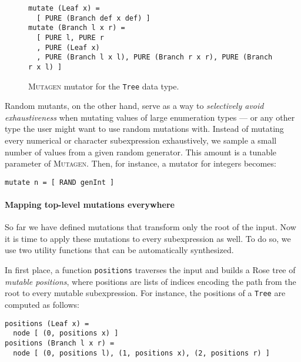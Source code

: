 \documentclass[sigconf, anonymous, review]{acmart}
\newcommand{\mutagen}{\textsc{Mutagen}\xspace}
\begin{document}
\begin{figure}[b]
\begin{verbatim}
mutate (Leaf x) =
  [ PURE (Branch def x def) ]
mutate (Branch l x r) =
  [ PURE l, PURE r
  , PURE (Leaf x)
  , PURE (Branch l x l), PURE (Branch r x r), PURE (Branch r x l) ]
\end{verbatim}
\vspace{-5pt}
\caption{\label{fig:mutagen:mutator}\mutagen mutator for the \texttt{Tree} data
  type.}
\vspace{-5pt}
\end{figure}

%
Random mutants, on the other hand, serve as a way to \emph{selectively avoid
  exhaustiveness} when mutating values of large enumeration types --- or any
other type the user might want to use random mutations with.
%
Instead of mutating every numerical or character subexpression exhaustively, we
sample a small number of values from a given random generator.
%
This amount is a tunable parameter of \mutagen.
%
Then, for instance, a mutator for integers becomes:

\begin{verbatim}
mutate n = [ RAND genInt ]
\end{verbatim}


\paragraph{Mapping top-level mutations everywhere}

So far we have defined mutations that transform only the root of the input.
%
Now it is time to apply these mutations to every subexpression as well.
%
To do so, we use two utility functions that can be automatically synthesized.

In first place, a function \texttt{positions} traverses the input and builds a
Rose tree of \emph{mutable positions}, where positions are lists of indices
encoding the path from the root to every mutable subexpression.
%
For instance, the positions of a \texttt{Tree} are computed as follows:

\begin{verbatim}
positions (Leaf x) =
  node [ (0, positions x) ]
positions (Branch l x r) =
  node [ (0, positions l), (1, positions x), (2, positions r) ]
\end{verbatim}
\end{document}
